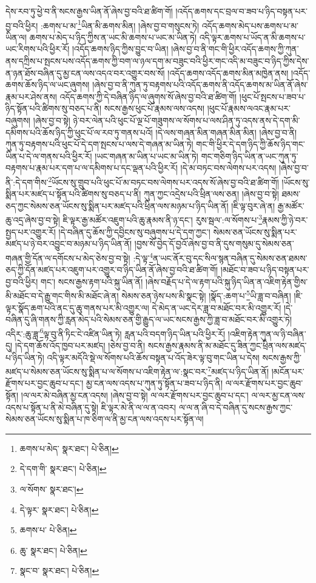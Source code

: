 དེས་རབ་ཏུ་ཕྱེ་བ་ནི་སངས་རྒྱས་ཡིན་ནོ་ཞེས་བྱ་བའི་ཐ་ཚིག་གོ། །འདོད་ཆགས་དང་བྲལ་བ་ཟབ་པ་ཉིད་བསྟན་པར་བྱ་བའི་ཕྱིར། :ཆགས་པ་མ་\footnote{ཆགས་པ་མེད་  སྣར་ཐང་།  པེ་ཅིན། }ཡིན་མི་ཆགས་མིན། །ཞེས་བྱ་བ་གསུངས་ཏེ། འདོད་ཆགས་མེད་པས་ཆགས་པ་མ་ཡིན་ལ། ཆགས་པ་མེད་པ་ཉིད་ཀྱིས་ན་ཡང་མི་ཆགས་པ་ཡང་མ་ཡིན་ཏེ། འདི་ལྟར་ཆགས་པ་ཡོད་ན་མི་ཆགས་པ་ཡང་རིགས་པའི་ཕྱིར་རོ། །འདོད་ཆགས་ཉིད་ཀྱིས་བྱུང་བ་ཡིན། །ཞེས་བྱ་བ་ནི་གང་གི་ཕྱིར་འདོད་ཆགས་ཀྱི་ཀུན་ནས་དཀྲིས་པ་སྤངས་པས་འདོད་ཆགས་ཀྱི་བག་ལ་ཉལ་དག་མ་བཟུང་བའི་ཕྱིར་གང་འདི་མ་བཟུང་བ་ཉིད་ཀྱིས་དེས་ན་ཉན་ཐོས་བཞིན་དུ་མྱ་ངན་ལས་འདའ་བར་འགྱུར་བས་སོ། །འདོད་ཆགས་འདོད་ཆགས་མིན་མཁྱེན་ནས། །འདོད་ཆགས་ཆོས་ཉིད་ལ་ཡང་ཞུགས། །ཞེས་བྱ་བ་ནི་ཀུན་ཏུ་བརྟགས་པའི་འདོད་ཆགས་ནི་འདོད་ཆགས་མ་ཡིན་ནོ་ཞེས་རྣམ་པར་ཤེས་ནས། འདོད་ཆགས་ཀྱི་དེ་བཞིན་ཉིད་ལ་ཞུགས་སོ་ཞེས་བྱ་བའི་ཐ་ཚིག་གོ། །ཕུང་པོ་སྤངས་པ་ཟབ་པ་ཉིད་སྟོན་པའི་ཚིགས་སུ་བཅད་པ་ནི། སངས་རྒྱས་ཕུང་པོ་རྣམས་ལས་འདས། །ཕུང་པོ་རྣམས་ལའང་རྣམ་པར་བཞུགས། །ཞེས་བྱ་བ་སྟེ། ཉེ་བར་ལེན་པའི་ཕུང་པོ་ལྔ་པོ་གཟུགས་ལ་སོགས་པ་ལས་ཤིན་ཏུ་འདས་ནས་དེ་དག་མི་དམིགས་པའི་ཆོས་ཉིད་ཀྱི་ཕུང་པོ་ལ་རབ་ཏུ་གནས་པའོ། །དེ་ལས་གཞན་མིན་གཞན་མིན་མིན། །ཞེས་བྱ་བ་ནི། ཀུན་ཏུ་བརྟགས་པའི་ཕུང་པོ་དེ་དག་སྤངས་པ་ལས་དེ་གཞན་མ་ཡིན་ཏེ། གང་གི་ཕྱིར་དེ་དག་ཉིད་ཀྱི་ཆོས་ཉིད་གང་ཡིན་པ་དེ་ལ་གནས་པའི་ཕྱིར་རོ། །ཡང་གཞན་མ་ཡིན་པ་ཡང་མ་ཡིན་ཏེ། གང་གཅིག་ཉིད་ཡིན་ན་ཡང་ཀུན་ཏུ་བརྟགས་པ་རྣམ་པར་དག་པ་ལ་དམིགས་པ་དང་ལྡན་པའི་ཕྱིར་རོ། །དེ་མ་བཏང་བས་ལེགས་པར་འདས། །ཞེས་བྱ་བ་ནི་:དེ་དག་གིས་\footnote{དེ་དག་གི་  སྣར་ཐང་།  པེ་ཅིན། }ཡོངས་སུ་གྲུབ་པའི་ཕུང་པོ་མ་བཏང་བས་ལེགས་པར་འདས་སོ་ཞེས་བྱ་བའི་ཐ་ཚིག་གོ། །ཡོངས་སུ་སྨིན་པར་མཛད་པ་སྟོན་པའི་ཚིགས་སུ་བཅད་པ་ནི། ཀུན་ཀྱང་འདྲེས་པའི་ཕྲིན་ལས་ཅན། །ཞེས་བྱ་བ་སྟེ། ཐམས་ཅད་ཀྱང་སེམས་ཅན་ཡོངས་སུ་སྨིན་པར་མཛད་པའི་ཕྲིན་ལས་མཉམ་པ་ཉིད་ཡིན་ནོ། །ཇི་ལྟ་བུར་ཞེ་ན། རྒྱ་མཚོར་ཆུ་འདྲ་ཞེས་བྱ་བ་སྟེ། ཇི་ལྟར་རྒྱ་མཚོར་འཇུག་པའི་ཆུ་རྣམས་ནི་ཉ་དང་། རུས་སྦལ་:ལ་སོགས་པ་\footnote{ལ་སོགས་  སྣར་ཐང་། }རྣམས་ཀྱི་ཉེ་བར་སྤྱད་པར་འགྱུར་རོ། །དེ་བཞིན་དུ་ཆོས་ཀྱི་དབྱིངས་སུ་བཞུགས་པ་དེ་དག་ཀྱང་། སེམས་ཅན་ཡོངས་སུ་སྨིན་པར་མཛད་པ་ཉེ་བར་འབྱུང་བ་མཉམ་པ་ཉིད་ཡིན་ནོ། །བྱས་སོ་བྱེད་དོ་བྱའོ་ཞེས་བྱ་བ་ནི་དུས་གསུམ་དུ་སེམས་ཅན་གཞན་གྱི་དོན་ལ་དགོངས་པ་མེད་ཅེས་བྱ་བ་སྟེ། :དེ་ལྟ་\footnote{དེ་ལྟར་  སྣར་ཐང་།  པེ་ཅིན། }ན་ཡང་ནོར་བུ་དང་སིལ་སྙན་བཞིན་དུ་སེམས་ཅན་ཐམས་ཅད་ཀྱི་དོན་མཛད་པར་འཇུག་པར་འགྱུར་བ་ཉིད་ཡིན་ནོ་ཞེས་བྱ་བའི་ཐ་ཚིག་གོ། །མཐོང་བ་ཟབ་པ་ཉིད་བསྟན་པར་བྱ་བའི་ཕྱིར། གང་། སངས་རྒྱས་རྟག་པའི་སྐུ་ཡིན་ནོ། །ཞེས་བརྗོད་པ་དེ་ལ་རྟག་པའི་སྐུ་ཉིད་ཡིན་ན་འཇིག་རྟེན་གྱིས་མི་མཐོང་བ་དེ་རྒྱུ་གང་གིས་མི་མཐོང་ཞེ་ན། སེམས་ཅན་ཉེས་པས་མི་སྣང་སྟེ། །སྣོད་:ཆག་པ་\footnote{ཆགས་པ་  པེ་ཅིན། }ཡི་ཟླ་བ་བཞིན། །ཇི་ལྟར་སྣོད་ཆག་པའི་ནང་དུ་ཆུ་གནས་པར་མི་འགྱུར་ལ། དེ་མེད་ན་ཡང་དེར་ཟླ་བ་མཐོང་བར་མི་འགྱུར་རོ། །དེ་བཞིན་དུ་ཞི་གནས་ཀྱི་རླན་མེད་པའི་སེམས་ཅན་གྱི་རྒྱུད་ལ་ཡང་སངས་རྒྱས་ཀྱི་ཟླ་བ་མཐོང་བར་མི་འགྱུར་ཏེ། འདིར་:ཆུ་ཟླ་\footnote{ཆུ་  སྣར་ཐང་།  པེ་ཅིན། }ལྟ་བུ་ནི་ཏིང་ངེ་འཛིན་ཡིན་ཏེ། རླན་པའི་བདག་ཉིད་ཡིན་པའི་ཕྱིར་རོ། །འཇིག་རྟེན་ཀུན་ལ་ཉི་བཞིན་དུ། །དེ་དག་ཆོས་འོད་ཁྱབ་པར་མཛད། །ཅེས་བྱ་བ་ནི། སངས་རྒྱས་རྣམས་ནི་མ་མཐོང་དུ་ཟིན་ཀྱང་ཕྲིན་ལས་མཛད་པ་ཉིད་ཡིན་ཏེ། འདི་ལྟར་མདོའི་སྡེ་ལ་སོགས་པའི་ཆོས་བསྟན་པ་འོད་ཟེར་ལྟ་བུ་གང་ཡིན་པ་དེས། སངས་རྒྱས་ཀྱི་མཛད་པ་སེམས་ཅན་ཡོངས་སུ་སྨིན་པ་ལ་སོགས་པ་འཇིག་རྟེན་ལ་:སྣང་བར་\footnote{སྣང་བ་  སྣར་ཐང་།  པེ་ཅིན། }མཛད་པ་ཉིད་ཡིན་ནོ། །མངོན་པར་རྫོགས་པར་བྱང་ཆུབ་པ་དང་། མྱ་ངན་ལས་འདས་པ་ཀུན་ཏུ་སྟོན་པ་ཟབ་པ་ཉིད་ནི། ལ་ལར་རྫོགས་པར་བྱང་ཆུབ་སྟོན། །ལ་ལར་མེ་བཞིན་མྱ་ངན་འདས། །ཞེས་བྱ་བ་སྟེ། ལ་ལར་རྫོགས་པར་བྱང་ཆུབ་པ་དང་། ལ་ལར་མྱ་ངན་ལས་འདས་པ་སྟོན་པ་ནི་མེ་བཞིན་དུ་སྟེ། ཇི་ལྟར་མེ་ནི་ལ་ལ་ན་འབར། ལ་ལ་ན་ཞི་བ་དེ་བཞིན་དུ་སངས་རྒྱས་ཀྱང་སེམས་ཅན་ཡོངས་སུ་སྨིན་པ་ཁ་ཅིག་ལ་ནི་མྱ་ངན་ལས་འདས་པར་སྟོན་ལ། 
